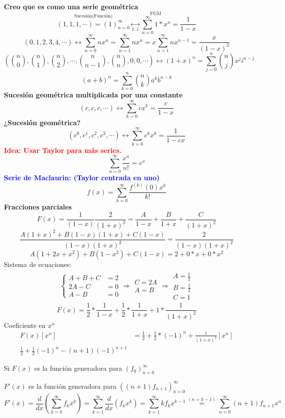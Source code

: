 \documentclass[../main.tex]{subfiles}
\begin{document}
\textbf{Creo que es como una serie geométrica}
\[
	\overset
	{
		\text{Sucesión(Función)}
	}
	{
		(1,1,1,\cdots) = (1)^\infty_{n=0}
	}
	\underset
	{
		1:1
	}
	{
		\longleftrightarrow
	}
	\overset
	{
		\text{FGM}
	}
	{
		\sum^\infty_{n=0}1*x^n
	}
	= \frac{1}{1-x}
\]
\[
	(0,1,2,3,4,\cdots)
	\longleftrightarrow
	\sum_{n=0}^\infty
	nx^n
	=
	\sum_{n=1}^\infty
	nx^n
	=
	x\sum_{n=1}^\infty
	nx^{n-1}
	=
	\frac{x}{(1-x)^2}
\]
\[
	\left(
		\binom{n}{0},
		\binom{n}{1},
		\binom{n}{2},
		\cdots,
		\binom{n}{n-1},
		\binom{n}{n},
		0,
		0,
		\cdots
	\right)
	\longleftrightarrow
	(1+x)^n
	= \sum_{j=0}^n \binom{n}{j}x^ji^{n-j}
\]
\[
	(a+b)^n =
	\sum_{k=0}^n
	\binom{n}{k} a^k b^{n-k}
\]
\textbf{Sucesión geométrica multiplicada por una constante}
\[
	(c,c,c,\cdots)
	\longleftrightarrow
	\sum_{k=0}^\infty
	cx^k
	= \frac{c}{1-x}
\]
\textbf{¿Sucesión geométrica?}
\[
	(c^0,c^1,c^2,c^3,\cdots)
	\longleftrightarrow
	\sum_{k=0}^\infty
	c^kx^k
	= \frac{1}{1-cx}
\]
\textcolor{red}
{
	\bfseries
	Idea: Usar Taylor para más series.
}
\[
	\sum_{n=0}^\infty
	\frac{x^n}{n!}
	= e^x
\]
\textcolor{blue}
{
	\bfseries
	Serie de Maclaurin: (Taylor centrada en uno)
}
\[
	f(x) =
	\sum_{k=0}^\infty
	\frac{f^{(k)}(0)x^k}{k!}
\]
\textbf{Fracciones parciales}
\[
	F(x)=
	\frac{1}{(1-x)}
	\frac{2}{(1+x)^2}
	=
	\frac{A}{1-x}
	+
	\frac{B}{1+x}
	+
	\frac{C}{(1+x)^2}
\]
\[
	\frac{A(1+x)^2+B(1-x)(1+x)+C(1-x)}{(1-x)(1+x)^2}
	=
	\frac{2}{(1-x)(1+x)^2}
\]
\[
	A(1+2x+x^2)+B(1-x^2)+C(1-x)
	=
	2+0*x+0*x^2
\]
Sistema de ecuaciones:
\begin{align*}
	\begin{cases}
		A+B+C &= 2\\
		2A-C &= 0\\
		A-B &= 0
	\end{cases}
	\Rightarrow
	\substack
	{
		C = 2A\\
		A = B
	}
	\Rightarrow
	\substack
	{
		A = \frac{1}{2}\\
		B = \frac{1}{2} \\
		C = 1
	}
\end{align*}
\[
	F(x) = \frac{1}{2}
	* \frac{1}{1-x}
	+
	\frac{1}{2}
	*
	\frac{1}{1+x}
	+
	1
	*
	\frac{1}{(1+x)^2}
\]
Coeficiente en $x^n$
\begin{align*}
	F(x)[x^n]
	&= \frac{1}{2}
	+
	\frac{1}{2}
	*(-1)^n
	+
	\frac{1}{(1+x)^2}
	[x^n]\\
	\frac{1}{2}
	+
	\frac{1}{2}
	(-1)^n
	-(n+1)(-1)^{n+1}
\end{align*}

Si $F(x)$ es la función generadora para $(f_0)_{n=0}^\infty$

$F'(x)$ es la función generadora para $\left((n+1)f_{n+1}\right)_{n=0}^\infty$
\[
	F'(x)=
	\frac{d}{dx}
	\left(
		\sum_{k=0}^\infty
		f_kx^k
	\right)
	=
	\sum_{k=1}^\infty
	\frac{d}{dx}
	(f_kx^k)
	=
	\sum_{k=1}^\infty
	kf_kx^{k-1}
	\overset
	{
		( n=k-1 )
	}
	{
		=
	}
	\sum_{n=0}^\infty
	(n+1)
	f_{n+1}x^n
\]
\end{document}
